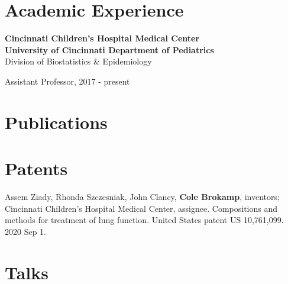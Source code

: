 \documentclass[margin,line]{res}
\newenvironment{list1}{
  \begin{list}{\ding{113}}{%
      \setlength{\itemsep}{0in}
      \setlength{\parsep}{0in} \setlength{\parskip}{0in}
      \setlength{\topsep}{0in} \setlength{\partopsep}{0in}
      \setlength{\leftmargin}{0.17in}}}{\end{list}}
\newenvironment{list3}{
  \begin{list}{}{%
      \setlength{\itemsep}{0in}
      \setlength{\parsep}{0in} \setlength{\parskip}{0in}
      \setlength{\topsep}{0in} \setlength{\partopsep}{0in}
      \setlength{\leftmargin}{0in}}}{\end{list}}
\begin{document}
\begin{resume}
\section{\sc Academic Experience}

{\bf Cincinnati Children's Hospital Medical Center}\\
{\bf University of Cincinnati Department of Pediatrics}\\
Division of Biostatistics \& Epidemiology\\
\vspace*{-.1in}
\begin{list1}
    \item[] Assistant Professor, 2017 - present
\end{list1}

\section{\sc Publications}


\section{\sc Patents}
Assem Ziady, Rhonda Szczesniak, John Clancy, \textbf{Cole Brokamp}, inventors; Cincinnati Children's Hospital Medical Center, assignee. Compositions and methods for treatment of lung function. United States patent US 10,761,099. 2020 Sep 1.

\section{\sc Talks}





\end{resume}
\end{document}
